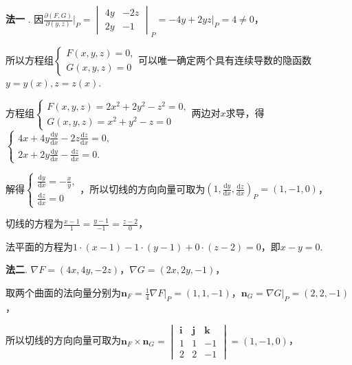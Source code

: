 \documentclass[../Main.tex]{subfiles}
\begin{document}
\begin{enumerate}
          \textbf{法一} . 因$\frac{\partial (F,G)}{\partial (y,z)}\bigg|_{P}=
              \begin{vmatrix}
                  4y & -2z \\
                  2y & -1
              \end{vmatrix}_{P}=\left.-4y+2yz\right|_{P}=4\neq 0$，

          所以方程组$\begin{cases}
                  F(x,y,z)=0, \\
                  G(x,y,z)=0
              \end{cases}$可以唯一确定两个具有连续导数的隐函数$y=y(x),z=z(x)$.

          方程组$\begin{cases}
                  F(x,y,z) = 2x^{2}+2y^{2}-z^{2}=0, \\
                  G(x,y,z)=x^{2}+y^{2}-z=0
              \end{cases}$两边对$x$求导，得 $\begin{cases}
                  4x+4y\frac{\mathrm{d}y}{\mathrm{d}x}-2z\frac{\mathrm{d}z}{\mathrm{d}x}= 0, \\
                  2x+2y\frac{\mathrm{d}y}{\mathrm{d}x}-\frac{\mathrm{d}z}{\mathrm{d}x}= 0.
              \end{cases}$

          解得$\begin{cases}
                  \frac{\mathrm{d}y}{\mathrm{d}x} = -\frac{x}{y}, \\
                  \frac{\mathrm{d}z}{\mathrm{d}x} = 0
              \end{cases}$，所以切线的方向向量可取为$\left(1,\frac{\mathrm{d}y}{\mathrm{d}x}
              ,\frac{\mathrm{d}z}{\mathrm{d}x}\right)_{P}=(1,-1,0)$，

          切线的方程为$\frac{x-1}{1}=\frac{y-1}{-1}=\frac{z-2}{0}$，

          法平面的方程为$1\cdot(x-1)-1\cdot(y-1)+0\cdot(z-2)=0$，即$x-y=0$.

          \textbf{法二}. $\nabla F = (4x,4y,-2z)$，$\nabla G = (2x,2y,-1)$，

          取两个曲面的法向量分别为$\boldsymbol{n}_{F} = \frac{1}{4}\nabla F|_{P} = (1
              ,1,-1)$，$\boldsymbol{n}_{G} = \nabla G|_{P} = (2,2,-1)$，

          所以切线的方向向量可取为$\boldsymbol{n}_{F}\times \boldsymbol{n}_{G} =
              \begin{vmatrix}
                  \boldsymbol{i} & \boldsymbol{j} & \boldsymbol{k} \\
                  1              & 1              & -1             \\
                  2              & 2              & -1
              \end{vmatrix}
              = (1,-1,0)$，


\end{enumerate}
\end{document}
